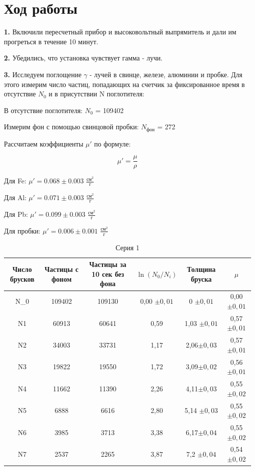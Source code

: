\documentclass[a4paper]{article}
\begin{document}
\section{Ход работы}

\textbf{1.} Включили пересчетный прибор и высоковольтный выпрямитель и дали им прогреться в течение 10 минут. \par
\textbf{2.} Убедились, что установка чувствует гамма - лучи.\par
\textbf{3.} Исследуем поглощение $\gamma$ - лучей в свинце, железе, алюминии и пробке. 
Для этого измерим число частиц, попадающих на счетчик за фиксированное время в отсутствие $N_{0}$ и в присутствии N поглотителя:\par
$\textbf{В отсутствие поглотителя:}$ $N_{0}$ = 109402 \par

Измерим фон с помощью свинцовой пробки: $N_{\text{фон}}$ = 272 \par

Рассчитаем коэффициенты $\mu '$ по формуле:

\[ \mu ' = \frac{\mu}{\rho}\]

Для Fe: $\mu ' = 0.068 \pm 0.003 $ $\frac{\text{см}^{2}}{\text{г}}$\par
Для Al: $\mu ' = 0.071 \pm 0.003 $ $\frac{\text{см}^{2}}{\text{г}}$\par
Для Pb: $\mu ' = 0.099 \pm 0.003 $ $\frac{\text{см}^{2}}{\text{г}}$\par
Для пробки: $\mu ' = 0.006 \pm 0.001 $ $\frac{\text{см}^{2}}{\text{г}}$\par



\newpage




\begin{table}[h]
\centering
\caption{Серия 1}
\begin{tabular}{|c|c|c|c|c|c|}
\hline
Число брусков & Частицы с фоном & Частицы за 10 сек без фона & $\ln(N_0/N_i)$ & Толщина бруска & $\mu$ \\
\hline
N\_0 & 109402 & 109130 & 0,00 $\pm 0,01$ & 0 $\pm 0,01$& 0,00 $\pm 0,01$ \\
N1 & 60913 & 60641 & 0,59 & 1,03 $\pm 0,01$& 0,57 $\pm 0,01$\\
N2 & 34003 & 33731 & 1,17 & 2,06$\pm 0,03$ & 0,57 $\pm 0,01$\\
N3 & 19822 & 19550 & 1,72 & 3,09$\pm 0,02$& 0,56 $\pm 0,01$\\
N4 & 11662 & 11390 & 2,26 & 4,11$\pm 0,03$ & 0,55 $\pm 0,02$ \\
N5 & 6888 & 6616 & 2,80 & 5,14 $\pm 0,03$& 0,55 $\pm 0,02$ \\
N6 & 3985 & 3713 & 3,38 & 6,17$\pm 0,04$ & 0,55 $\pm 0,02$ \\
N7 & 2537 & 2265 & 3,87 & 7,2 $\pm 0,04$& 0,54 $\pm 0,02$\\
\hline
\end{tabular}
\end{table}
\end{document}
